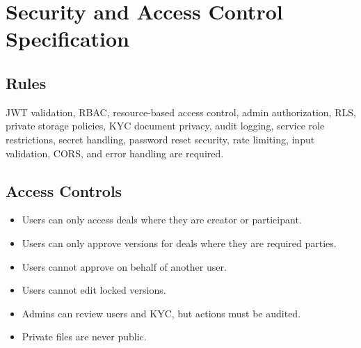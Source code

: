 \chapter{Security and Access Control Specification}
\section{Rules}
JWT validation, RBAC, resource-based access control, admin authorization, RLS, private storage policies, KYC document privacy, audit logging, service role restrictions, secret handling, password reset security, rate limiting, input validation, CORS, and error handling are required.
\section{Access Controls}
\begin{itemize}
  \item Users can only access deals where they are creator or participant.
  \item Users can only approve versions for deals where they are required parties.
  \item Users cannot approve on behalf of another user.
  \item Users cannot edit locked versions.
  \item Admins can review users and KYC, but actions must be audited.
  \item Private files are never public.
\end{itemize}


